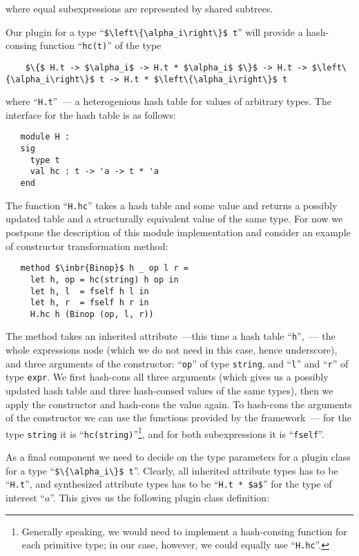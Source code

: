 where equal subexpressions are represented by shared subtrees.

Our plugin for a type ``\lstinline|$\left\{\alpha_i\right\}$ t|'' will provide a hash-consing function ``\lstinline{hc(t)}'' of the type

\begin{lstlisting}
    $\{$ H.t -> $\alpha_i$ -> H.t * $\alpha_i$ $\}$ -> H.t -> $\left\{\alpha_i\right\}$ t -> H.t * $\left\{\alpha_i\right\}$ t
\end{lstlisting}

where ``\lstinline{H.t}''~--- a heterogenious hash table for values of arbitrary types. The interface for the hash table is
as follows:

\begin{lstlisting}
   module H :
   sig
     type t
     val hc : t -> 'a -> t * 'a
   end
\end{lstlisting}

The function ``\lstinline{H.hc}'' takes a hash table and some value and returns a possibly updated table and a structurally equivalent value
of the same type. For now we postpone the description of this module implementation and consider an example of constructor transformation
method:

\begin{lstlisting}   
   method $\inbr{Binop}$ h _ op l r =
     let h, op = hc(string) h op in
     let h, l  = fself h l in
     let h, r  = fself h r in
     H.hc h (Binop (op, l, r))
\end{lstlisting}

The method takes an inherited attribute~---this time a hash table ``\lstinline{h}'',~--- the whole expressions node (which we do not
need in this case, hence underscore), and three arguments of the constructor: ``\lstinline{op}'' of type \lstinline{string}, and
``\lstinline{l}'' and ``\lstinline{r}'' of type \lstinline{expr}. We first hash-cons all three arguments (which gives us a possibly updated
hash table and three hash-consed values of the same types), then we apply the constructor and hash-cons the value again. To hash-cons
the arguments of the constructor we can use the functions provided by the framework~--- for the type \lstinline{string} it is
``\lstinline{hc(string)}''\footnote{Generally speaking, we would need to implement a hash-consing function for each primitive type; in
  our case, however, we could equally use ``\lstinline{H.hc}''.}, and for both subexpressions it is ``\lstinline{fself}''.

As a final component we need to decide on the type parameters for a plugin class for a type ``\lstinline|$\{\alpha_i\}$ t|''. Clearly,
all inherited attribute types has to be ``\lstinline{H.t}'', and synthesized attribute types has to be ``\lstinline{H.t * $a$}'' for the
type of interest ``$a$''. This gives us the following plugin class definition:


